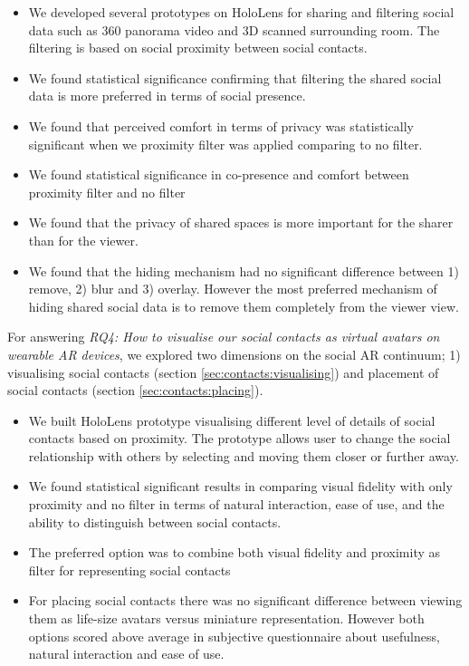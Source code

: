 \begin{itemize}
    \item{We developed several prototypes on HoloLens for sharing and filtering social data such as 360 panorama video and 3D scanned surrounding room. The filtering is based on social proximity between social contacts.}
    \item{We found statistical significance confirming that filtering the shared social data is more preferred in terms of social presence.}
    \item{We found that perceived comfort in terms of privacy was statistically significant when we proximity filter was applied comparing to no filter.}
    \item{We found statistical significance in co-presence and comfort between proximity filter and no filter}
    \item{We found that the privacy of shared spaces is more important for the sharer than for the viewer.}
    \item{We found that the hiding mechanism had no significant difference between 1) remove, 2) blur and 3) overlay. However the most preferred mechanism of hiding shared social data is to remove them completely from the viewer view.}
\end{itemize}

For answering \textit{RQ4: How to visualise our social contacts as virtual avatars on wearable AR devices}, we explored two dimensions on the social AR continuum; 1) visualising social contacts (section \ref{sec:contacts:visualising}) and placement of social contacts (section \ref{sec:contacts:placing}). 

\begin{itemize}
    \item{We built HoloLens prototype visualising different level of details of social contacts based on proximity. The prototype allows user to change the social relationship with others by selecting and moving them closer or further away.}
    \item{We found statistical significant results in comparing visual fidelity with only proximity and no filter in terms of natural interaction, ease of use, and the ability to distinguish between social contacts.}
    \item{The preferred option was to combine both visual fidelity and proximity as filter for representing social contacts}
    \item{For placing social contacts there was no significant difference between viewing them as life-size avatars versus miniature representation. However both options scored above average in subjective questionnaire about usefulness, natural interaction and ease of use.}
\end{itemize}

